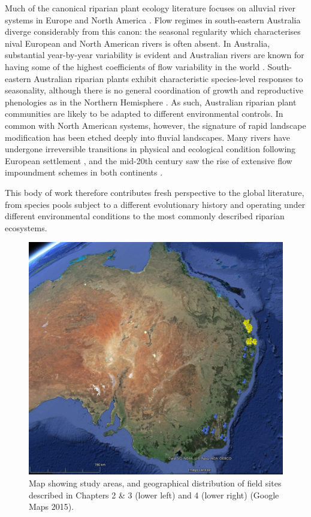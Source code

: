 \documentclass[openright,12pt,a4paper]{memoir}
\begin{document}
Much of the canonical riparian plant ecology literature focuses on alluvial river systems in Europe and North America \citep{Nilsson1989, Naiman1997, Tabacchi1998, Naiman2005, Corenblit2007}. Flow regimes in south-eastern Australia diverge considerably from this canon: the seasonal regularity which characterises nival European and North American rivers is often absent. In Australia, substantial year-by-year variability is evident and Australian rivers are known for having some of the highest coefficients of flow variability in the world \citep{Peel2004, Rustomji2009}. South-eastern Australian riparian plants exhibit characteristic species-level responses to seasonality, although there is no general coordination of growth and reproductive phenologies as in the Northern Hemisphere \citep{Ford1979}. As such, Australian riparian plant communities are likely to be adapted to different environmental controls. In common with North American systems, however, the signature of rapid landscape modification has been etched deeply into fluvial landscapes. Many rivers have undergone irreversible transitions in physical and ecological condition following European settlement \citep{Knopf1988, Fleischner1994, Wasson1994, Brierley1999}, and the mid-20th century saw the rise of extensive flow impoundment schemes in both continents \citep{Lloyd2004, Graf2006}.

This body of work therefore contributes fresh perspective to the global literature, from species pools subject to a different evolutionary history and operating under different environmental conditions to the most commonly described riparian ecosystems.

\begin{figure}[ht]
\begin{center}
\includegraphics[width=12cm,keepaspectratio=true]{map.png} %
\caption[Map of study areas described in Chapters 2 and 3.]{\small{Map showing study areas, and geographical distribution of field sites described in Chapters 2 \& 3 (lower left) and 4 (lower right) (Google Maps 2015).}\label{fig:Ch6_F1}}
\end{center}
\end{figure}   
\clearpage
\end{document}
